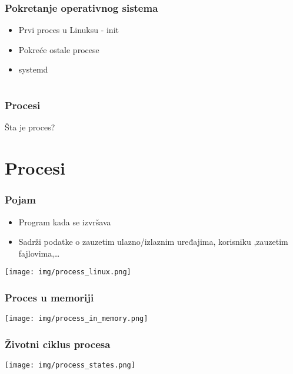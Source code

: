 \documentclass{beamer}
\begin{document}
\begin{frame}
    \frametitle{Pokretanje operativnog sistema}
    \begin{itemize}
        \item Prvi proces u Linuksu - init \newline
        \item Pokreće ostale procese \newline
        \item systemd \newline
    \end{itemize}
\end{frame}

\section*{}
\begin{frame}
    \frametitle{Procesi}
    \begin{center}
        \large{Šta je proces?}
    \end{center}
\end{frame}

\section*{Procesi}
\begin{frame}
    \frametitle{Pojam}
    \begin{itemize}
        \item Program kada se izvršava \newline
        \item Sadrži podatke o zauzetim ulazno/izlaznim uređajima, korisniku ,zauzetim fajlovima,\dots \newline
    \end{itemize}
    \begin{center}
        \texttt{[image: img/process\_linux.png]}
    \end{center}
\end{frame}

\begin{frame}
    \frametitle{Proces u memoriji}
    \begin{center}
        \texttt{[image: img/process\_in\_memory.png]}
    \end{center}
\end{frame}

\begin{frame}
    \frametitle{Životni ciklus procesa}
    \begin{center}
        \texttt{[image: img/process\_states.png]}
    \end{center}
\end{frame}
\end{document}

